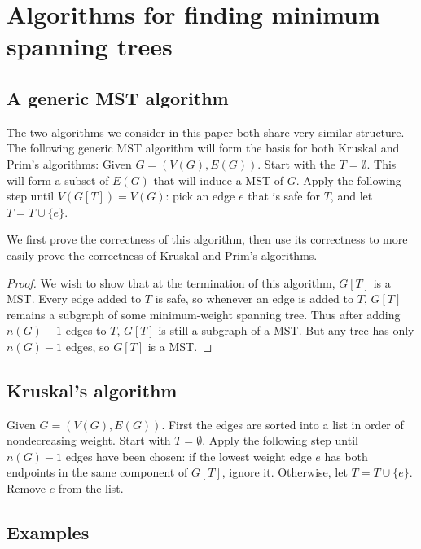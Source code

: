 \documentclass[11pt]{article}
\begin{document}
\section{Algorithms for finding minimum spanning trees}


\subsection{A generic MST algorithm}
The two algorithms we consider in this paper both share very similar structure.
The following generic MST algorithm will form the basis for both Kruskal and
Prim's algorithms:
\newline
Given $G=(V(G),E(G))$. Start with the $T=\emptyset$. This will form a subset of
$E(G)$ that will induce a MST of $G$. Apply the following step until
$V(G[T])=V(G)$: pick an edge $e$ that is safe for $T$, and let $T=T\cup\{e\}$.
\cite{CLRS}

We first prove the correctness of this algorithm, then use its correctness to
more easily prove the correctness of Kruskal and Prim's algorithms.
\begin{proof}
	We wish to show that at the termination of this algorithm, $G[T]$ is a
	MST. Every edge added to $T$ is safe, so whenever
	an edge is added to $T$, $G[T]$ remains a subgraph of some minimum-weight
	spanning tree. Thus after adding $n(G)-1$ edges to $T$, $G[T]$ is still a
	subgraph of a MST. But any tree has only $n(G)-1$
	edges, so $G[T]$ is a MST.
\end{proof}


\subsection{Kruskal's algorithm}
Given $G=(V(G),E(G))$. First the edges are sorted into a list in order of
nondecreasing weight. Start with $T=\emptyset$. Apply the following step until
$n(G)-1$ edges have been chosen: if the lowest weight edge $e$ has both
endpoints in the same component of $G[T]$, ignore it. Otherwise, let
$T=T\cup\{e\}$. Remove $e$ from the list.\cite{MST}


\subsection{Examples}
\begin{figure}[H]

\end{figure}
\begin{figure}[H]

\end{figure}
\begin{figure}[H]

\end{figure}
\end{document}
